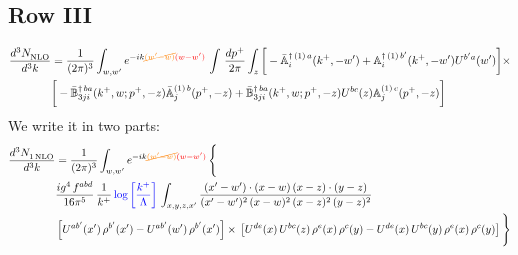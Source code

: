 \documentclass[9pt]{article}
\def\mf#1{\mathbb{#1}}
\numberwithin{equation}{section}
\begin{document}
\subsection{Row III}
\begin{align}
\frac{d^{3}N_{\rm NLO}^{\rm}}{d^{3}k}  & = \frac{1}{(2\pi)^{3}}  \int_{w, w^\prime} e^{-ik{\color{orange}\cancel{(w^\prime-w)}}{\color{red}(w-w^\prime)}}\, \int\,\frac{dp^{+}}{2\pi} \int_{z} \bigg[-\bar{\mf{A}}^{\dagger\,(1)\,a}_{i}(k^{+},-w^{\prime})+\mf{A}^{\dagger\, (1)\, b^{\prime}}_{i}(k^{+},-w^{\prime})U^{b^{\prime}a}(w^{\prime})\bigg]\times \notag \\ &  \bigg[-\Bar{\mf{B}}^{\dagger\, ba}_{3ji}(k^{+}, w; p^{+}, -z)\Bar{\mf{A}}^{(1)\,b}_{j}(p^{+}, - z)+ \Bar{\mf{B}}^{\dagger\, ba}_{3ji}(k^{+},w; p^{+},-z) U^{bc}(z) \mf{A}^{(1)\, c}_{j}(p^{+},- z)\bigg]\nonumber
\end{align}
We write it in two parts: 
\begin{align}
   \frac{d^{3}N_{1\,\rm NLO}^{\rm}}{d^{3}k}  & = \frac{1}{(2\pi)^{3}}  \int_{w, w^\prime} e^{-ik{\color{orange}\cancel{(w^\prime-w)}}{\color{red}(w-w^\prime)}}\, \Bigg\{\notag \\ & \frac{ig^{4}\,f^{abd}}{16\pi^{5}}\,\frac{1}{k^{+}}\,{\color{blue}\log{\left[\frac{k^{+}}{\Lambda}\right]}}\,\int_{x,y,z,x'} \frac{(x'-w')\cdot (x-w)\, (x-z)\cdot (y-z)}{(x'-w')^{2}\, (x-w)^{2}\, (x-z)^{2}\, (y-z)^{2}}\, \notag \\ & \left[U^{ab'}(x')\,\rho^{b'}(x')-U^{ab'}(w')\, \rho^{b'}(x')\right]\times\, \left[U^{de}(x)\,U^{bc}(z)\, \rho^{e}(x)\,\rho^{c}(y)-U^{de}(x)\,U^{bc}(y)\,\rho^{e}(x)\,\rho^{c}(y)\right]\Bigg\}
\end{align}
\end{document}
